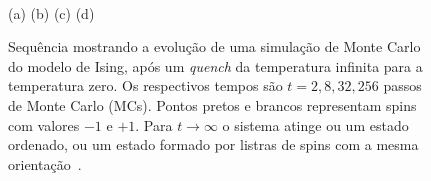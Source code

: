 \begin{figure}[h!]
 \setlength\fboxsep{0pt}
 \setlength\fboxrule{0.5pt}
 \centering
  \\
 (a) \hspace{30mm} (b) \hspace{30mm} (c) \hspace{30mm} (d) \vspace{3mm} \\
 \caption{Sequência mostrando a evolução de uma simulação de Monte Carlo do modelo de Ising, após um \textit{quench} da temperatura infinita para a temperatura zero. Os respectivos tempos são $t=2,8,32,256$ passos de Monte Carlo (MCs). Pontos pretos e brancos representam spins com valores $-1$ e $+1$. Para $t \rightarrow \infty$ o sistema atinge ou um estado ordenado, ou um estado formado por listras de spins com a mesma orientação~\cite{BlanchardPicco}.}
 \label{fig.IsingSnap}
\end{figure}


